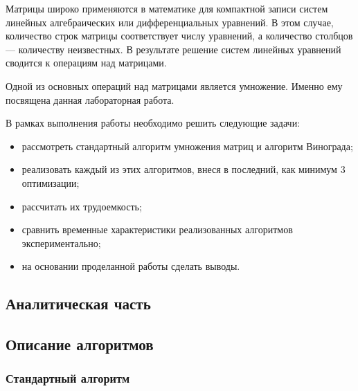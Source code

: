 \documentclass[a4paper,12pt]{article}
\begin{document}
Матрицы широко применяются в математике для компактной записи систем линейных алгебраических или дифференциальных уравнений. В этом случае, количество строк матрицы соответствует числу уравнений, а количество столбцов — количеству неизвестных. В результате решение систем линейных уравнений сводится к операциям над матрицами.

Одной из основных операций над матрицами является умножение. Именно ему посвящена данная лабораторная работа. 
		
В рамках выполнения работы необходимо решить следующие задачи:   
		\begin{itemize}
		    \item рассмотреть стандартный алгоритм умножения матриц и алгоритм Винограда;
			\item реализовать каждый из этих алгоритмов, внеся в последний, как минимум 3 оптимизации;
			\item рассчитать их трудоемкость;
			\item сравнить временные характеристики реализованных алгоритмов экспериментально; 		
			\item на основании проделанной работы сделать выводы.
		\end{itemize}
    \newpage

    \begin{center}
        \section{Аналитическая часть}
	        \subsection{Описание алгоритмов}
    \end{center}
\subsubsection{Стандартный алгоритм}
\end{document}

